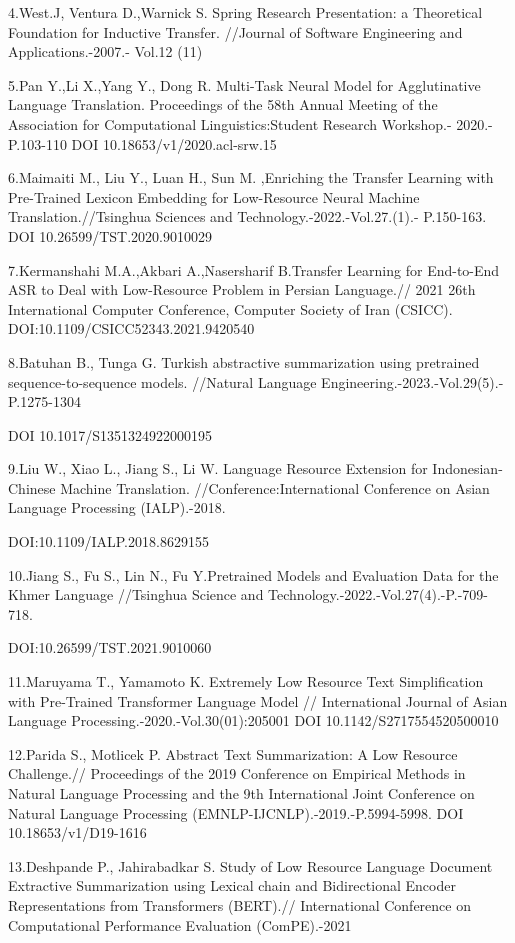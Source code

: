 4.West.J, Ventura D.,Warnick S. Spring Research Presentation: a
Theoretical Foundation for Inductive Transfer. //Journal of Software
Engineering and Applications.-2007.- Vol.12 (11)

5.Pan Y.,Li X.,Yang Y., Dong R. Multi-Task Neural Model for
Agglutinative Language Translation. Proceedings of the 58th Annual
Meeting of the Association for Computational Linguistics:Student
Research Workshop.- 2020.- P.103-110 DOI 10.18653/v1/2020.acl-srw.15

6.Maimaiti M., Liu Y., Luan H., Sun M. ,Enriching the Transfer Learning
with Pre-Trained Lexicon Embedding for Low-Resource Neural Machine
Translation.//Tsinghua Sciences and Technology.-2022.-Vol.27.(1).-
P.150-163. DOI 10.26599/TST.2020.9010029

7.Kermanshahi M.A.,Akbari A.,Nasersharif B.Transfer Learning for
End-to-End ASR to Deal with Low-Resource Problem in Persian Language.//
2021 26th International Computer Conference, Computer Society of Iran
(CSICC). DOI:10.1109/CSICC52343.2021.9420540

8.Batuhan B., Tunga G. Turkish abstractive summarization using
pretrained sequence-to-sequence models. //Natural Language
Engineering.-2023.-Vol.29(5).- P.1275-1304

DOI 10.1017/S1351324922000195

9.Liu W., Xiao L., Jiang S., Li W. Language Resource Extension for
Indonesian-Chinese Machine Translation. //Conference:International
Conference on Asian Language Processing (IALP).-2018.

DOI:10.1109/IALP.2018.8629155

10.Jiang S., Fu S., Lin N., Fu Y.Pretrained Models and Evaluation Data
for the Khmer Language //Tsinghua Science and
Technology.-2022.-Vol.27(4).-P.-709-718.

DOI:10.26599/TST.2021.9010060

11.Maruyama T., Yamamoto K. Extremely Low Resource Text Simplification
with Pre-Trained Transformer Language Model // International Journal of
Asian Language Processing.-2020.-Vol.30(01):205001 DOI
10.1142/S2717554520500010

12.Parida S., Motlicek P. Abstract Text Summarization: A Low Resource
Challenge.// Proceedings of the 2019 Conference on Empirical Methods in
Natural Language Processing and the 9th International Joint Conference
on Natural Language Processing (EMNLP-IJCNLP).-2019.-P.5994-5998. DOI
10.18653/v1/D19-1616

13.Deshpande P., Jahirabadkar S. Study of Low Resource Language Document
Extractive Summarization using Lexical chain and Bidirectional Encoder
Representations from Transformers (BERT).// International Conference on
Computational Performance Evaluation (ComPE).-2021

